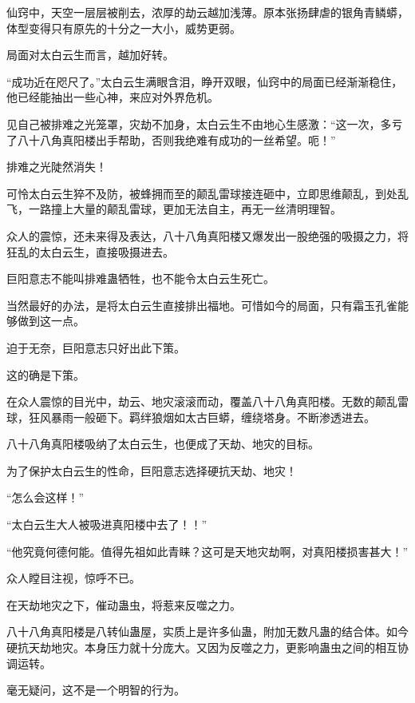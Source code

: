
\begin{this_body}



仙窍中，天空一层层被削去，浓厚的劫云越加浅薄。原本张扬肆虐的银角青鳞蟒，体型变得只有原先的十分之一大小，威势更弱。

局面对太白云生而言，越加好转。

“成功近在咫尺了。”太白云生满眼含泪，睁开双眼，仙窍中的局面已经渐渐稳住，他已经能抽出一些心神，来应对外界危机。

见自己被排难之光笼罩，灾劫不加身，太白云生不由地心生感激：“这一次，多亏了八十八角真阳楼出手帮助，否则我绝难有成功的一丝希望。呃！”

排难之光陡然消失！

可怜太白云生猝不及防，被蜂拥而至的颠乱雷球接连砸中，立即思维颠乱，到处乱飞，一路撞上大量的颠乱雷球，更加无法自主，再无一丝清明理智。

众人的震惊，还未来得及表达，八十八角真阳楼又爆发出一股绝强的吸摄之力，将狂乱的太白云生，直接吸摄进去。

巨阳意志不能叫排难蛊牺牲，也不能令太白云生死亡。

当然最好的办法，是将太白云生直接排出福地。可惜如今的局面，只有霜玉孔雀能够做到这一点。

迫于无奈，巨阳意志只好出此下策。

这的确是下策。

在众人震惊的目光中，劫云、地灾滚滚而动，覆盖八十八角真阳楼。无数的颠乱雷球，狂风暴雨一般砸下。羁绊狼烟如太古巨蟒，缠绕塔身。不断渗透进去。

八十八角真阳楼吸纳了太白云生，也便成了天劫、地灾的目标。

为了保护太白云生的性命，巨阳意志选择硬抗天劫、地灾！

“怎么会这样！”

“太白云生大人被吸进真阳楼中去了！！”

“他究竟何德何能。值得先祖如此青睐？这可是天地灾劫啊，对真阳楼损害甚大！”

众人瞠目注视，惊呼不已。

在天劫地灾之下，催动蛊虫，将惹来反噬之力。

八十八角真阳楼是八转仙蛊屋，实质上是许多仙蛊，附加无数凡蛊的结合体。如今硬抗天劫地灾。本身压力就十分庞大。又因为反噬之力，更影响蛊虫之间的相互协调运转。

毫无疑问，这不是一个明智的行为。


\end{this_body}
